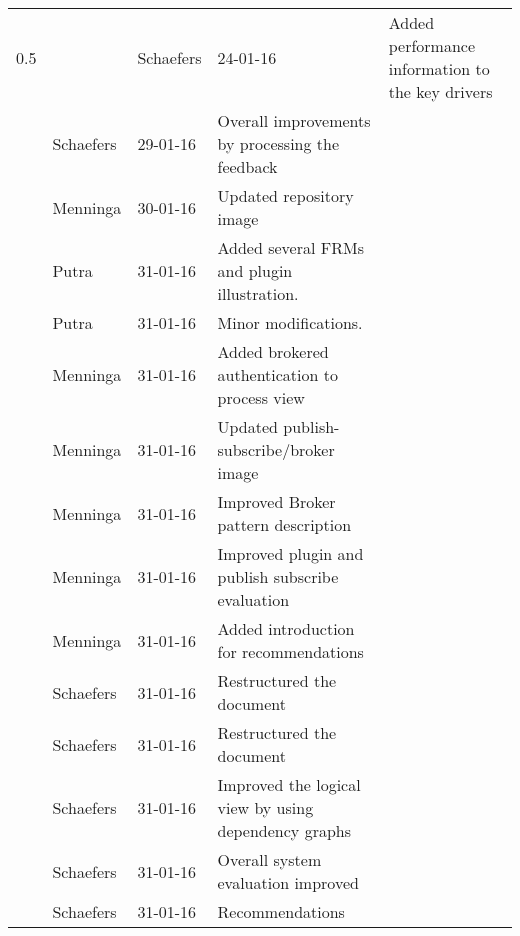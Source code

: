 \begin{longtable}{L{} L{} L{} L{}}
				0.5 & 
					& Schaefers & 24-01-16 & Added performance information to the key drivers \\
					& Schaefers & 29-01-16 & Overall improvements by processing the feedback \\
					& Menninga  & 30-01-16 & Updated repository image\\
					& Putra		& 31-01-16 & Added several FRMs and plugin illustration. \\
					& Putra		& 31-01-16 & Minor modifications. \\
					& Menninga  & 31-01-16 & Added brokered authentication to process view \\
					& Menninga  & 31-01-16 & Updated publish-subscribe/broker image \\
					& Menninga  & 31-01-16 & Improved Broker pattern description \\
					& Menninga  & 31-01-16 & Improved plugin and publish subscribe evaluation\\
					& Menninga  & 31-01-16 & Added introduction for recommendations \\
					& Schaefers & 31-01-16 & Restructured the document \\
					& Schaefers & 31-01-16 & Restructured the document \\
					& Schaefers & 31-01-16 & Improved the logical view by using dependency graphs \\
					& Schaefers & 31-01-16 & Overall system evaluation improved \\
					& Schaefers & 31-01-16 & Recommendations \\					
				\midrule

\end{longtable}